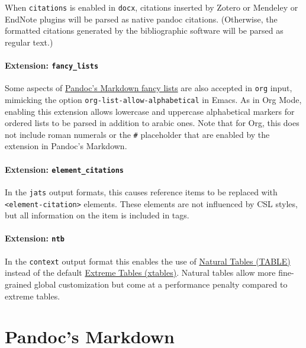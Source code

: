 \documentclass[
]{article}
\begin{document}
When \texttt{citations} is enabled in \texttt{docx}, citations inserted
by Zotero or Mendeley or EndNote plugins will be parsed as native pandoc
citations. (Otherwise, the formatted citations generated by the
bibliographic software will be parsed as regular text.)

\paragraph{\texorpdfstring{Extension:
\texttt{fancy\_lists}}{Extension: fancy\_lists}}\label{org-fancy-lists}

Some aspects of \hyperref[extension-fancy_lists]{Pandoc's Markdown fancy
lists} are also accepted in \texttt{org} input, mimicking the option
\texttt{org-list-allow-alphabetical} in Emacs. As in Org Mode, enabling
this extension allows lowercase and uppercase alphabetical markers for
ordered lists to be parsed in addition to arabic ones. Note that for
Org, this does not include roman numerals or the \texttt{\#} placeholder
that are enabled by the extension in Pandoc's Markdown.

\paragraph{\texorpdfstring{Extension:
\texttt{element\_citations}}{Extension: element\_citations}}\label{extension-element_citations}

In the \texttt{jats} output formats, this causes reference items to be
replaced with \texttt{\textless{}element-citation\textgreater{}}
elements. These elements are not influenced by CSL styles, but all
information on the item is included in tags.

\paragraph{\texorpdfstring{Extension:
\texttt{ntb}}{Extension: ntb}}\label{extension-ntb}

In the \texttt{context} output format this enables the use of
\href{https://wiki.contextgarden.net/TABLE}{Natural Tables (TABLE)}
instead of the default
\href{https://wiki.contextgarden.net/xtables}{Extreme Tables (xtables)}.
Natural tables allow more fine-grained global customization but come at
a performance penalty compared to extreme tables.

\section{Pandoc's Markdown}\label{pandocs-markdown}
\end{document}
